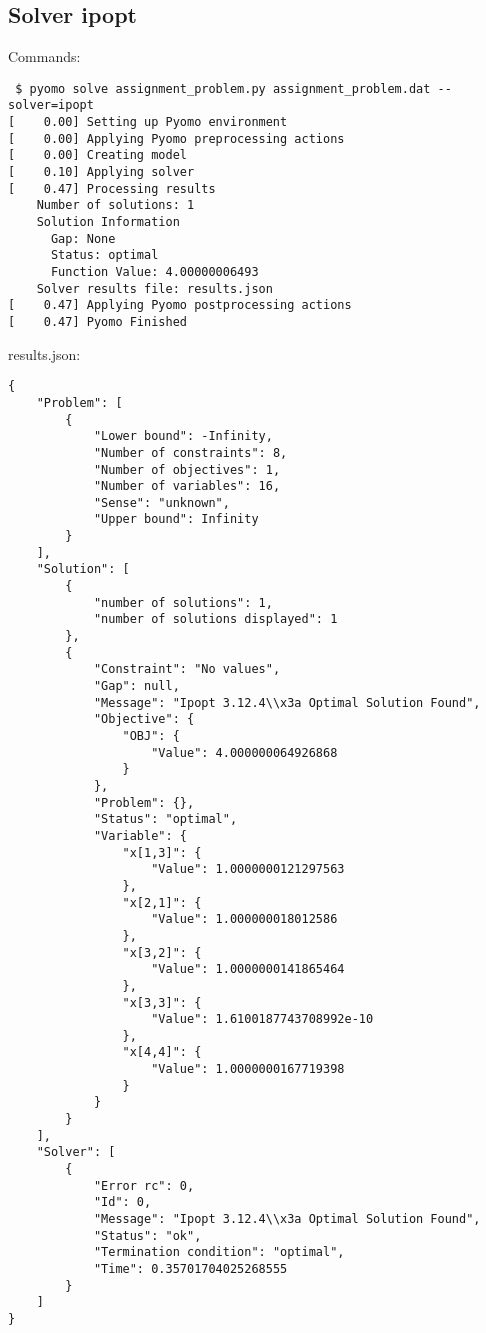 \documentclass[a4paper]{article}
\begin{document}
\subsection*{Solver ipopt}
Commands:
\begin{verbatim}
 $ pyomo solve assignment_problem.py assignment_problem.dat --solver=ipopt
[    0.00] Setting up Pyomo environment
[    0.00] Applying Pyomo preprocessing actions
[    0.00] Creating model
[    0.10] Applying solver
[    0.47] Processing results
    Number of solutions: 1
    Solution Information
      Gap: None
      Status: optimal
      Function Value: 4.00000006493
    Solver results file: results.json
[    0.47] Applying Pyomo postprocessing actions
[    0.47] Pyomo Finished
\end{verbatim}
results.json:
\begin{verbatim}
{
    "Problem": [
        {
            "Lower bound": -Infinity, 
            "Number of constraints": 8, 
            "Number of objectives": 1, 
            "Number of variables": 16, 
            "Sense": "unknown", 
            "Upper bound": Infinity
        }
    ], 
    "Solution": [
        {
            "number of solutions": 1, 
            "number of solutions displayed": 1
        }, 
        {
            "Constraint": "No values", 
            "Gap": null, 
            "Message": "Ipopt 3.12.4\\x3a Optimal Solution Found", 
            "Objective": {
                "OBJ": {
                    "Value": 4.000000064926868
                }
            }, 
            "Problem": {}, 
            "Status": "optimal", 
            "Variable": {
                "x[1,3]": {
                    "Value": 1.0000000121297563
                }, 
                "x[2,1]": {
                    "Value": 1.000000018012586
                }, 
                "x[3,2]": {
                    "Value": 1.0000000141865464
                }, 
                "x[3,3]": {
                    "Value": 1.6100187743708992e-10
                }, 
                "x[4,4]": {
                    "Value": 1.0000000167719398
                }
            }
        }
    ], 
    "Solver": [
        {
            "Error rc": 0, 
            "Id": 0, 
            "Message": "Ipopt 3.12.4\\x3a Optimal Solution Found", 
            "Status": "ok", 
            "Termination condition": "optimal", 
            "Time": 0.35701704025268555
        }
    ]
}\end{verbatim}
\end{document}

